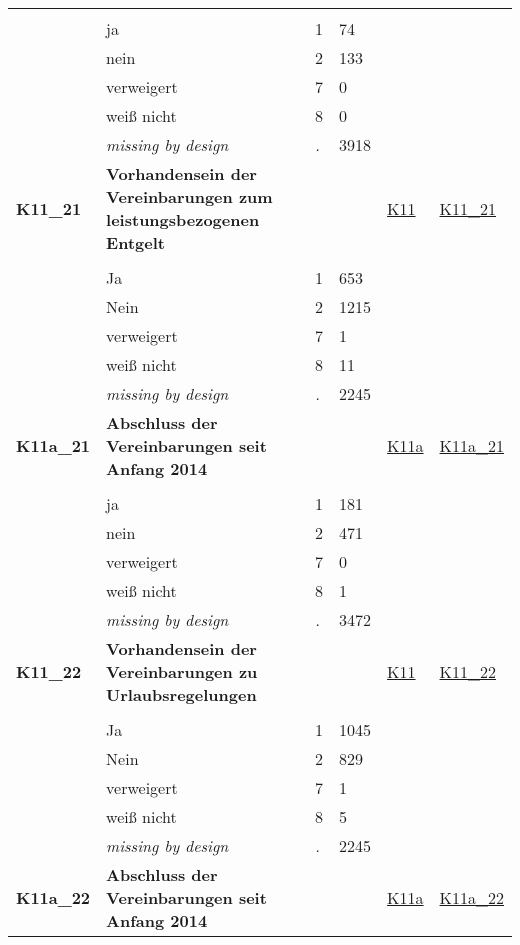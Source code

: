 \begin{longtable}{| L{2.45cm} | L{6cm} | C{1.5cm} | R{1cm} | C{2.25cm} | C{2.25cm} |}
   &  &  &  &  &  \\ 
   & ja & 1 & 74 &  &  \\ 
   & nein & 2 & 133 &  &  \\ 
   & verweigert & 7 & 0 &  &  \\ 
   & weiß nicht & 8 & 0 &  &  \\ 
   & \textit{missing by design} & \textit{.} & 3918 &  &  \\ 
   \midrule
\textbf{K11\_21}\label{var:K11:21} & \textbf{Vorhandensein der Vereinbarungen zum leistungsbezogenen Entgelt} &  &  & \hyperref[K11]{K11} & \hyperref[var:suf:K11:21]{K11\_21} \\ 
   &  &  &  &  &  \\ 
   & Ja & 1 & 653 &  &  \\ 
   & Nein & 2 & 1215 &  &  \\ 
   & verweigert & 7 & 1 &  &  \\ 
   & weiß nicht & 8 & 11 &  &  \\ 
   & \textit{missing by design} & \textit{.} & 2245 &  &  \\ 
   \midrule
\textbf{K11a\_21}\label{var:K11a:21} & \textbf{Abschluss der Vereinbarungen seit Anfang 2014} &  &  & \hyperref[K11a]{K11a} & \hyperref[var:suf:K11a:21]{K11a\_21} \\ 
   &  &  &  &  &  \\ 
   & ja & 1 & 181 &  &  \\ 
   & nein & 2 & 471 &  &  \\ 
   & verweigert & 7 & 0 &  &  \\ 
   & weiß nicht & 8 & 1 &  &  \\ 
   & \textit{missing by design} & \textit{.} & 3472 &  &  \\ 
   \midrule
\textbf{K11\_22}\label{var:K11:22} & \textbf{Vorhandensein der Vereinbarungen zu Urlaubsregelungen} &  &  & \hyperref[K11]{K11} & \hyperref[var:suf:K11:22]{K11\_22} \\ 
   &  &  &  &  &  \\ 
   & Ja & 1 & 1045 &  &  \\ 
   & Nein & 2 & 829 &  &  \\ 
   & verweigert & 7 & 1 &  &  \\ 
   & weiß nicht & 8 & 5 &  &  \\ 
   & \textit{missing by design} & \textit{.} & 2245 &  &  \\ 
   \midrule
\textbf{K11a\_22}\label{var:K11a:22} & \textbf{Abschluss der Vereinbarungen seit Anfang 2014} &  &  & \hyperref[K11a]{K11a} & \hyperref[var:suf:K11a:22]{K11a\_22} \\ 

\end{longtable}
